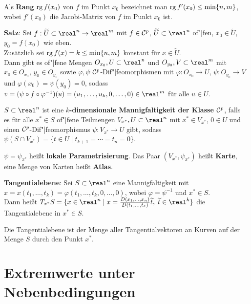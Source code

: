 Als \textbf{Rang} $\operatorname{rg} f(x_0)$ von $f$ im Punkt $x_0$ bezeichnet man
$\operatorname{rg} f'(x_0) \le \min\{n, m\}$, wobei $f'(x_0)$ die Jacobi-Matrix von $f$
im Punkt $x_0$ ist.

\textbf{Satz}:
Sei $f: \widetilde{U} \subset \real^n \rightarrow \real^m$ mit
$f \in \mathcal{C}^p$, $\widetilde{U} \subset \real^n$ of"|fen,
$x_0 \in \widetilde{U}$, $y_0 = f(x_0)$ wie eben. \\
Zusätzlich sei $\operatorname{rg} f(x) = k \le \min\{n, m\}$ konstant für
$x \in \widetilde{U}$. \\
Dann gibt es of"|fene Mengen $O_{x_0}, U \subset \real^n$ und
$O_{y_0}, V \subset \real^m$ mit $x_0 \in O_{x_0}$, $y_0 \in O_{y_0}$ sowie
$\varphi, \psi$ $\mathcal{C}^p$-Dif"|feomorphismen mit
$\varphi: O_{x_0} \rightarrow U$,
$\psi: O_{y_0} \rightarrow V$ und
$\varphi(x_0) = \psi(y_0) = 0$, sodass
$v = (\psi \circ f \circ \varphi^{-1})(u) =
(u_1, \dotsc, u_k, 0, \dotsc, 0) \in \real^m$
für alle $u \in U$.

\linie

$S \subset \real^n$ ist eine
\textbf{$k$-dimensionale Mannigfaltigkeit der Klasse $\mathcal{C}^p$}, falls \\
es für alle $x^\ast \in S$ of"|fene Teilmengen $V_{x^\ast}, U \subset \real^n$
mit $x^\ast \in V_{x^\ast}$, $0 \in U$ und einen $\mathcal{C}^p$-Dif"|feomorphismus
$\psi: V_{x^\ast} \rightarrow U$ gibt, sodass
$\psi(S \cap V_{x^\ast}) = \{t \in U \;|\; t_{k+1} = \dotsb = t_n = 0\}$.

$\psi = \psi_{x^\ast}$ heißt \textbf{lokale Parametrisierung}.
Das Paar $(V_{x^\ast}, \psi_{x^\ast})$ heißt \textbf{Karte}, eine Menge von
Karten heißt \textbf{Atlas}.

\linie

\textbf{Tangentialebene}:
Sei $S \subset \real^n$ eine Mannigfaltigkeit mit \\
$x = x(t_1, \dotsc, t_k) = \varphi(t_1, \dotsc, t_k, 0, \dotsc, 0)$, wobei
$\varphi = \psi^{-1}$ und $x^\ast \in S$. \\
Dann heißt $T_{x^\ast} S = \{x \in \real^n \;|\; x =
\frac{D(x_1, \dotsc, x_n)}{D(t_1, \dotsc, t_k)} \widetilde{t},\;
\widetilde{t} \in \real^k\}$
die Tangentialebene in $x^\ast \in S$.

Die Tangentialebene ist der Menge aller Tangentialvektoren an Kurven
auf der Menge $S$ durch den Punkt $x^\ast$.


\pagebreak

\section{%
    Extremwerte unter Nebenbedingungen%
}

